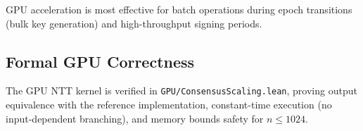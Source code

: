 GPU acceleration is most effective for batch operations during epoch transitions (bulk key generation) and high-throughput signing periods.

\subsection{Formal GPU Correctness}

The GPU NTT kernel is verified in \texttt{GPU/ConsensusScaling.lean}, proving output equivalence with the reference implementation, constant-time execution (no input-dependent branching), and memory bounds safety for $n \leq 1024$.

